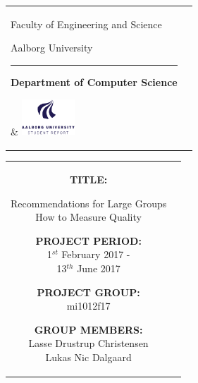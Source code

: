 \begin{titlepage}
\thispagestyle{empty}

\begin{nopagebreak}
{\samepage

\begin{tabular}{lr}
        \parbox{14.5cm}{
          {\LARGE Faculty of Engineering and Science}

          {\small Aalborg University}
          \vspace{-0.3cm}\\
        \hrule
        \vspace{0.2cm}
          {\bf Department of Computer Science}
         }   & \hspace{-2.0cm} \includegraphics[width=2cm]{graphics/aau_logo_en}
\end{tabular}

\begin{tabular}{cc}
\parbox{7cm}{
\hspace{2cm}
\begin{description}

\item {\bf TITLE:}

Recommendations for Large Groups \\
How to Measure Quality 


\end{description}

\parbox{8cm}{

\begin{description}
        \item {\bf PROJECT PERIOD:}\\
          1$^{st}$ February 2017 -\\ 13$^{th}$ June 2017\\
          \hspace{4cm}
        \item {\bf PROJECT GROUP:}\\
          mi1012f17\\
          \hspace{4cm}
        \item {\bf GROUP MEMBERS:}\\
          Lasse Drustrup Christensen \\
          Lukas Nic Dalgaard 
          \hspace{2cm}
          

\end{description}}}
\end{tabular}}
\end{nopagebreak}
\end{titlepage}
